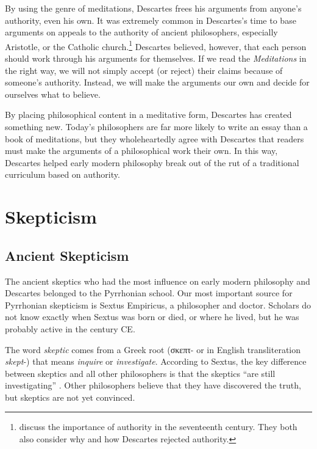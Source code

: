 By using the genre of meditations, Descartes frees his arguments from anyone's authority, even his own. It was extremely common in Descartes's time to base arguments on appeals to the authority of ancient philosophers, especially Aristotle, or the Catholic church.\footnote{\textcites[4--7]{cottingham1986}[4--5]{garber1998} discuss the importance of authority in the seventeenth century. They both also consider why and how Descartes rejected authority.} Descartes believed, however, that each person should work through his arguments for themselves. If we read the \textit{Meditations} in the right way, we will not simply accept (or reject) their claims because of someone's authority. Instead, we will make the arguments our own and decide for ourselves what to believe.

By placing philosophical content in a meditative form, Descartes has created something new. Today's philosophers are far more likely to write an essay than a book of meditations, but they wholeheartedly agree with Descartes that readers must make the arguments of a philosophical work their own. In this way, Descartes helped early modern philosophy break out of the rut of a traditional curriculum based on authority.

\section{Skepticism}

\subsection*{Ancient Skepticism}

The ancient skeptics who had the most influence on early modern philosophy and Descartes belonged to the Pyrrhonian school. Our most important source for Pyrrhonian skepticism is Sextus Empiricus, a philosopher and doctor. Scholars do not know exactly when Sextus was born or died, or where he lived, but he was probably active in the  century CE.

The word \textit{skeptic} comes from a Greek root (\textgreek{σκεπτ}- or in English transliteration \textit{skept}-) that means \textit{inquire} or \textit{investigate}. According to Sextus, the key difference between skeptics and all other philosophers is that the skeptics ``are still investigating'' \parencite[I 3]{annasbarnes1994}. Other philosophers believe that they have discovered the truth, but skeptics are not yet convinced.

